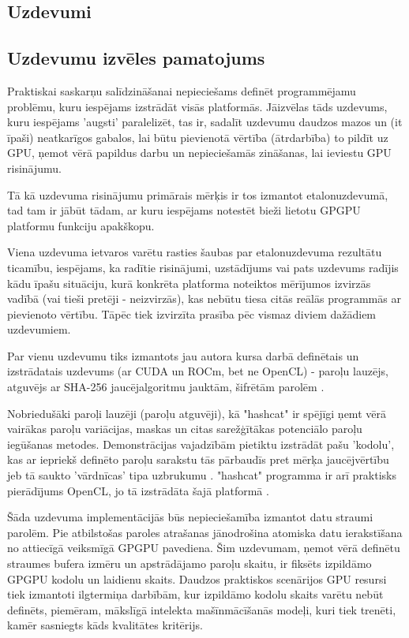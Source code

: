 \begin{center}
    \chapter{Uzdevumi}
\end{center}
\section{Uzdevumu izvēles pamatojums}

Praktiskai saskarņu salīdzināšanai nepieciešams definēt programmējamu problēmu,
kuru iespējams izstrādāt visās platformās.  Jāizvēlas tāds uzdevums, kuru
iespējams 'augsti' paralelizēt, tas ir, sadalīt uzdevumu daudzos mazos un (it
īpaši) neatkarīgos gabalos, lai būtu pievienotā vērtība (ātrdarbība) to pildīt
uz GPU, ņemot vērā papildus darbu un nepieciešamās zināšanas, lai ieviestu GPU
risinājumu.

Tā kā uzdevuma risinājumu primārais mērķis ir tos izmantot etalonuzdevumā, tad
tam ir jābūt tādam, ar kuru iespējams notestēt bieži lietotu GPGPU
platformu funkciju apakškopu.

Viena uzdevuma ietvaros varētu rasties šaubas par etalonuzdevuma rezultātu
ticamību, iespējams, ka radītie risinājumi, uzstādījums vai pats uzdevums
radījis kādu īpašu situāciju, kurā konkrēta platforma noteiktos mērījumos
izvirzās vadībā (vai tieši pretēji - neizvirzās), kas nebūtu tiesa citās reālās
programmās ar pievienoto vērtību. Tāpēc tiek izvirzīta prasība pēc vismaz
diviem dažādiem
uzdevumiem.

Par vienu uzdevumu tiks izmantots jau autora kursa darbā definētais un 
izstrādatais uzdevums (ar CUDA un ROCm, bet ne OpenCL) - paroļu lauzējs,
atguvējs ar SHA-256 jaucējalgoritmu jauktām, šifrētām parolēm \cite{kursa-darbs}.

Nobriedušāki paroļi lauzēji (paroļu atguvēji), kā "hashcat" \cite{hashcat} ir
spējīgi ņemt vērā vairākas paroļu variācijas, maskas un citas sarežģītākas
potenciālo paroļu iegūšanas metodes. Demonstrācijas vajadzībām pietiktu
izstrādāt pašu 'kodolu', kas ar iepriekš definēto paroļu sarakstu tās
pārbaudīs pret mērķa jaucējvērtību jeb tā saukto 'vārdnīcas' tipa
uzbrukumu \cite{hashcat_dict_atk}. "hashcat" programma ir arī praktisks
pierādījums OpenCL, jo tā izstrādāta šajā
platformā \cite{hashcat}.

Šāda uzdevuma implementācijās būs nepieciešamība izmantot datu straumi parolēm.
Pie atbilstošas paroles atrašanas jānodrošina atomiska datu ierakstīšana no
attiecīgā veiksmīgā GPGPU pavediena. Šim uzdevumam, ņemot vērā definētu
straumes bufera izmēru un apstrādājamo paroļu skaitu, ir fiksēts izpildāmo
GPGPU kodolu un laidienu skaits. Daudzos praktiskos scenārijos GPU resursi tiek
izmantoti ilgtermiņa darbībām, kur izpildāmo kodolu skaits varētu nebūt
definēts, piemēram, mākslīgā intelekta mašīnmācīšanās modeļi, kuri tiek trenēti,
kamēr sasniegts kāds kvalitātes kritērijs.


